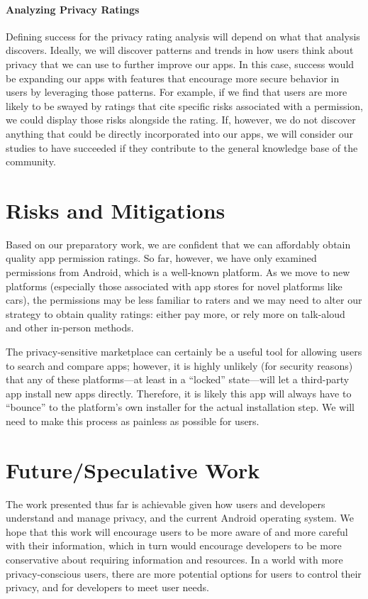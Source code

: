 \documentclass[11pt]{article}
\begin{document}
\paragraph{Analyzing Privacy Ratings}

Defining success for the privacy rating analysis will depend on what
that analysis discovers. Ideally, we will discover patterns and trends
in how users think about privacy that we can use to further improve
our apps. In this case, success would be expanding our
apps with features that encourage more secure behavior in
users by leveraging those patterns. For example, if we find that users
are more likely to be swayed by ratings that cite specific risks
associated with a permission, we could display those risks alongside
the rating.  If, however, we do not discover anything that could be
directly incorporated into our apps, we will consider our studies to
have succeeded if they contribute to the general knowledge base of the
community.

\section{Risks and Mitigations}

Based on our preparatory work, we are confident that we can affordably
obtain quality app permission ratings. So far, however, we have only
examined permissions from Android, which is a well-known platform. As
we move to new platforms (especially those associated with app stores
for novel platforms like cars), the permissions may be less familiar
to raters and we may need to alter our strategy to obtain quality
ratings: either pay more, or rely more on talk-aloud and other
in-person methods.

The privacy-sensitive marketplace can certainly be a useful tool for 
allowing users to search and compare apps; however, it is highly unlikely
(for security reasons) that any of these platforms---at least in a
``locked'' state---will let a third-party app install new apps
directly. Therefore, it is likely this app will always have to
``bounce'' to the platform's own installer for the actual installation
step. We will need to make this process as painless as possible for
users.


\section{Future/Speculative Work}

The work presented thus far is achievable given how users and developers
understand and manage privacy, and the current Android operating system.  
We hope that this work will
encourage users to be more aware of and more careful with their information, 
which in turn would encourage developers to be more conservative about requiring
information and resources. In a world with more privacy-conscious users, there
are more potential options for users to control their privacy, and for developers 
to meet user needs.
\end{document}

